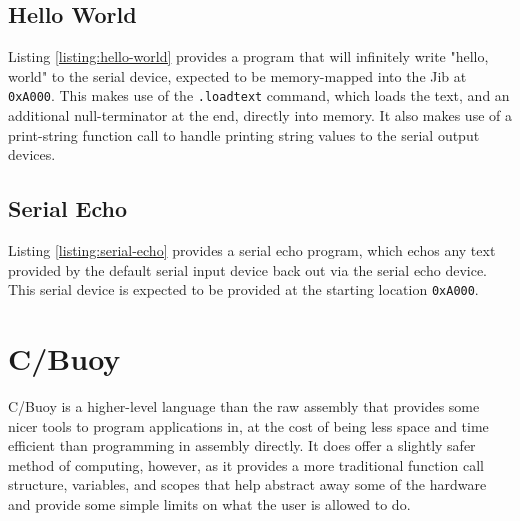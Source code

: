 \documentclass{article}
\begin{document}


\subsection{Hello World}

Listing  \ref{listing:hello-world} provides a program that will infinitely write "hello, world" to the serial device, expected to be memory-mapped into the Jib at \texttt{0xA000}. This makes use of the \texttt{.loadtext} command, which loads the text, and an additional null-terminator at the end, directly into memory. It also makes use of a print-string function call to handle printing string values to the serial output devices.



\pagebreak

\subsection{Serial Echo}

Listing \ref{listing:serial-echo} provides a serial echo program, which echos any text provided by the default serial input device back out via the serial echo device. This serial device is expected to be provided at the starting location \texttt{0xA000}.



\pagebreak

\section{C/Buoy}

C/Buoy is a higher-level language than the raw assembly that provides some nicer tools to program applications in, at the cost of being less space and time efficient than programming in assembly directly. It does offer a slightly safer method of computing, however, as it provides a more traditional function call structure, variables, and scopes that help abstract away some of the hardware and provide some simple limits on what the user is allowed to do.
\end{document}
